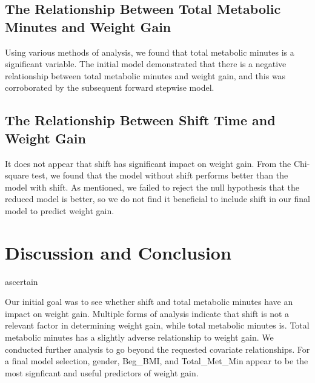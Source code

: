 \documentclass[]{article}
\begin{document}
\hypertarget{the-relationship-between-total-metabolic-minutes-and-weight-gain}{%
\subsection{The Relationship Between Total Metabolic Minutes and Weight
Gain}\label{the-relationship-between-total-metabolic-minutes-and-weight-gain}}

Using various methods of analysis, we found that total metabolic minutes
is a significant variable. The initial model demonstrated that there is
a negative relationship between total metabolic minutes and weight gain,
and this was corroborated by the subsequent forward stepwise model.

\hypertarget{the-relationship-between-shift-time-and-weight-gain}{%
\subsection{The Relationship Between Shift Time and Weight
Gain}\label{the-relationship-between-shift-time-and-weight-gain}}

It does not appear that shift has significant impact on weight gain.
From the Chi-square test, we found that the model without shift performs
better than the model with shift. As mentioned, we failed to reject the
null hypothesis that the reduced model is better, so we do not find it
beneficial to include shift in our final model to predict weight gain.

\hypertarget{discussion-and-conclusion}{%
\section{Discussion and Conclusion}\label{discussion-and-conclusion}}

ascertain

Our initial goal was to see whether shift and total metabolic minutes
have an impact on weight gain. Multiple forms of analysis indicate that
shift is not a relevant factor in determining weight gain, while total
metabolic minutes is. Total metabolic minutes has a slightly adverse
relationship to weight gain. We conducted further analysis to go beyond
the requested covariate relationships. For a final model selection,
gender, Beg\_BMI, and Total\_Met\_Min appear to be the most signficant
and useful predictors of weight gain.
\end{document}
